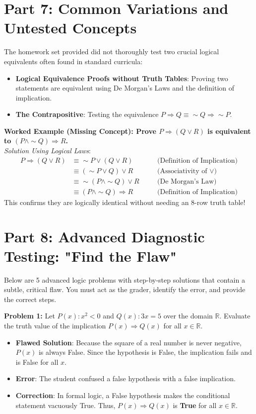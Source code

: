 \documentclass[11pt]{article}
\begin{document}
\section{Part 7: Common Variations and Untested Concepts}

The homework set provided did not thoroughly test two crucial logical equivalents often found in standard curricula:
\begin{itemize}
    \item \textbf{Logical Equivalence Proofs without Truth Tables}: Proving two statements are equivalent using De Morgan's Laws and the definition of implication.
    \item \textbf{The Contrapositive}: Testing the equivalence $P \Rightarrow Q \equiv \sim Q \Rightarrow \sim P$.
\end{itemize}

\textbf{Worked Example (Missing Concept): Prove $P \Rightarrow (Q \vee R)$ is equivalent to $(P \wedge \sim Q) \Rightarrow R$.} \\
\textit{Solution Using Logical Laws}:
\begin{align*}
    P \Rightarrow (Q \vee R) &\equiv \sim P \vee (Q \vee R) \quad &&\text{(Definition of Implication)} \\
    &\equiv (\sim P \vee Q) \vee R \quad &&\text{(Associativity of } \vee) \\
    &\equiv \sim (P \wedge \sim Q) \vee R \quad &&\text{(De Morgan's Law)} \\
    &\equiv (P \wedge \sim Q) \Rightarrow R \quad &&\text{(Definition of Implication)}
\end{align*}
This confirms they are logically identical without needing an 8-row truth table!

\newpage
\section{Part 8: Advanced Diagnostic Testing: "Find the Flaw"}

Below are 5 advanced logic problems with step-by-step solutions that contain a subtle, critical flaw. You must act as the grader, identify the error, and provide the correct steps.

\vspace{10pt}
\textbf{Problem 1:} Let $P(x): x^2 < 0$ and $Q(x): 3x = 5$ over the domain $\mathbb{R}$. Evaluate the truth value of the implication $P(x) \Rightarrow Q(x)$ for all $x \in \mathbb{R}$.
\begin{itemize}
    \item \textbf{Flawed Solution}: Because the square of a real number is never negative, $P(x)$ is always False. Since the hypothesis is False, the implication fails and is False for all $x$.
    \item \textbf{Error}: The student confused a false hypothesis with a false implication.
    \item \textbf{Correction}: In formal logic, a False hypothesis makes the conditional statement vacuously True. Thus, $P(x) \Rightarrow Q(x)$ is \textbf{True} for all $x \in \mathbb{R}$.
\end{itemize}
\end{document}
